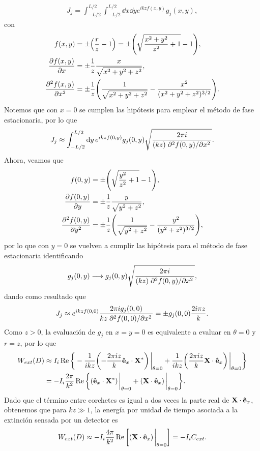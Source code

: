 \begin{enumerate}[label=\textbf{Ejercicio \thechapter.\arabic*},resume]
%
\begin{align*}
 J_j = \int_{-L/2}^{L/2}\int_{-L/2}^{L/2}\dd{x}\dd{y}e^{ikzf(x,y)}g_j(x,y),
\end{align*}
%
con 
%
\begin{align*}
f(x,y) &= \pm\qty(\frac{r}{z}-1) = \pm\qty(\sqrt{\frac{x^2+y^2}{z^2}+1}-1),\\
\pdv{f(x,y)}{x} &= \pm\frac{ 1}{z}\frac{ x}{\sqrt{x^2+y^2+z^2}},\\
\pdv[2]{f(x,y)}{x} &= \pm\frac{ 1}{z}\qty(\frac{1}{\sqrt{x^2+y^2+z^2}} - \frac{x^2}{(x^2+y^2+z^2)^{3/2}}).
\end{align*}
%
Notemos que con $x = 0$ se cumplen las hipótesis para emplear el método de fase estacionaria, por lo que
%
\begin{align*}
 J_j \approx \int_{-L/2}^{L/2}\dd{y}e^{ikzf(0,y)}g_j(0,y)\sqrt{\frac{2\pi i}{(kz)\pdv*[2]{f(0,y)}{x}}}.
\end{align*}
%
Ahora, veamos que
\begin{align*}
f(0,y) &=\pm\qty(\sqrt{\frac{y^2}{z^2}+1}-1),\\
\pdv{f(0,y)}{y} &= \pm \frac{ 1}{z}\frac{ y}{\sqrt{y^2+z^2}},\\
\pdv[2]{f(0,y)}{y} &= \pm\frac{ 1}{z}\qty(\frac{1}{\sqrt{y^2+z^2}} - \frac{y^2}{(y^2+z^2)^{3/2}}),
\end{align*}
por lo que con $y=0$ se vuelven a cumplir las hipótesis para el método de fase estacionaria identificando
%
\begin{align*}
g_j(0,y) \longrightarrow g_j(0,y)\sqrt{\frac{2\pi i}{(kz)\pdv*[2]{f(0,y)}{x}}},
\end{align*}
%
dando como resultado que
%
\begin{align*}
 J_j \approx e^{ikzf(0,0)} \frac{2\pi i g_j(0,0)}{kz\pdv*[2]{f(0,0)}{x}} = \pm g_j(0,0) \frac{2i\pi z}{k} .
\end{align*}
%
Como $z>0$, la evaluación de $g_j$ en $x=y=0$ es equivalente a evaluar en $\theta = 0$ y $r = z$, por lo que 
%
\begin{align*}
W_{ext}(D) &\approx I_i\Re\bigg\{
	-\frac{1}{ikz}\qty(-\frac{2\pi i z}{k}\vu{e}_x\cdot\vb{X}^*)\eval_{\theta = 0}
	+ \frac{1}{ikz}\qty(\frac{2\pi i z}{k}\vb{X}\cdot\vu{e}_x)\eval_{\theta = 0}
\bigg\}\\
	&= -I_i \frac{2\pi}{k^2}\Re\bigg\{
	\qty(\vu{e}_x\cdot\vb{X}^*)\eval_{\theta = 0} + \qty(\vb{X}\cdot\vu{e}_x)\eval_{\theta = 0}
\bigg\}.
\end{align*}
%
Dado que el término entre corchetes es igual a dos veces la parte real de $\vb{X}\cdot\vu{e}_x$, obtenemos 	que para $kz\gg 1$, la energía por unidad de tiempo asociada a la extinción sensada por un detector es
%
\begin{align*}
W_{ext}(D) \approx - I_i \frac{4\pi}{k^2}\Re\qty[ \qty(\vb{X}\cdot\vu{e}_x)\eval_{\theta = 0}] = -I_iC_{ext}.
\end{align*}
%

\end{enumerate}




















